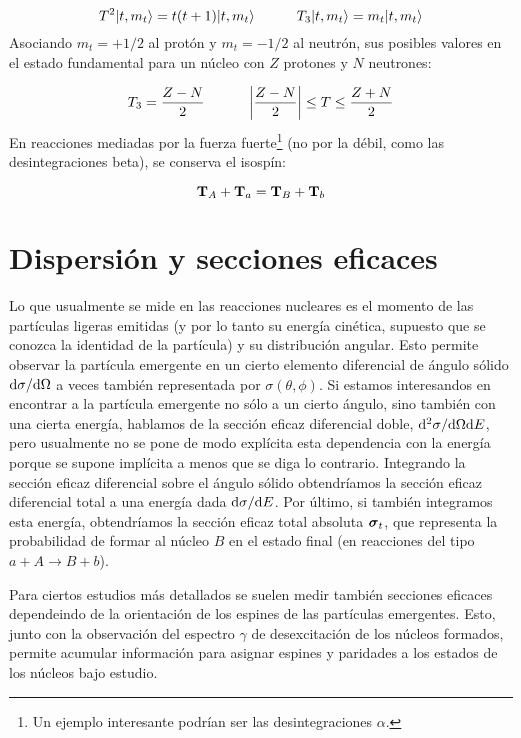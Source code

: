 \begin{equation}
	T^2 |t,m_t\rangle = t(t+1) |t,m_t \rangle \quad \quad \quad T_3 |t,m_t\rangle = m_t |t,m_t\rangle
\end{equation}
Asociando $m_t=+1/2$ al protón y $m_t=-1/2$ al neutrón, sus posibles valores en el estado fundamental para un núcleo con $Z$ protones y $N$ neutrones:

\begin{equation}
	T_3 = \frac{Z-N}{2} \quad \quad \quad \left| \frac{Z-N}{2} \right| \leq T \leq \frac{Z+N}{2}
\end{equation}
En reacciones mediadas por la fuerza fuerte\footnote{Un ejemplo interesante podrían ser las desintegraciones $\alpha$.} (no por la débil, como las desintegraciones beta), se conserva el isospín:

\begin{equation}
	\mathbf{T}_A + \mathbf{T}_a = \mathbf{T}_B + \mathbf{T}_b
\end{equation}

\section{Dispersión y secciones eficaces}

Lo que usualmente se mide en las reacciones nucleares es el momento de las partículas ligeras emitidas (y por lo tanto su energía cinética, supuesto que se conozca la identidad de la partícula) y su distribución angular. Esto permite observar la partícula emergente en un cierto elemento diferencial de ángulo sólido $\mathrm{d} \sigma / \mathrm{d} \Omega$ a veces también representada por $\sigma (\theta, \phi)$. Si estamos interesandos en encontrar a la partícula emergente no sólo a un cierto ángulo, sino también con una cierta energía, hablamos de la sección eficaz diferencial doble, $\mathrm{d}^2 \sigma / \mathrm{d} \Omega \mathrm{d} E$, pero usualmente no se pone de modo explícita esta dependencia con la energía porque se supone implícita a menos que se diga lo contrario. Integrando la sección eficaz diferencial sobre el ángulo sólido obtendríamos la sección eficaz diferencial total a una energía dada $\mathrm{d} \sigma / \mathrm{d} E$. Por último, si también integramos esta energía, obtendríamos la sección eficaz total absoluta $\boldsymbol{\sigma}_t$, que representa la probabilidad de formar al núcleo $B$ en el estado final (en reacciones del tipo $a+A\longrightarrow B + b$). 

Para ciertos estudios más detallados se suelen medir también secciones eficaces dependeindo de la orientación de los espines de las partículas emergentes. Esto, junto con la observación del espectro $\gamma$ de desexcitación de los núcleos formados, permite acumular información para asignar espines y paridades a los estados de los núcleos bajo estudio.

